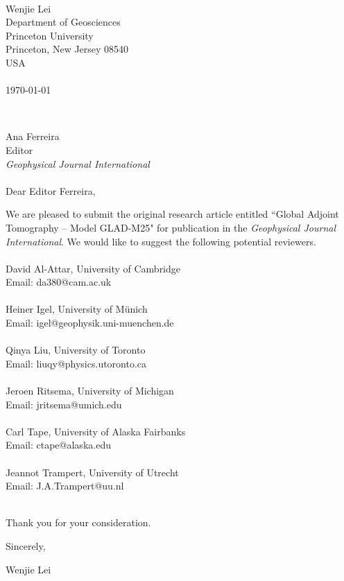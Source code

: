 \documentclass[11pt]{article}
\begin{document}

\begin{minipage}[t]{0.55\textwidth}
~ \vspace{0pt}
\end{minipage}
\begin{minipage}[t]{0.45\textwidth}
Wenjie Lei \\
Department of Geosciences \\
Princeton University \\
Princeton, New Jersey 08540\\
USA \\
~ \\
\today \\ 
\end{minipage} \hspace{0cm}\\

\par
\noindent
Ana Ferreira\\
Editor \\
\textit{Geophysical Journal International}\\
~ \\
Dear Editor Ferreira,\\
\par \noindent
We are pleased to submit the original research article entitled ``Global Adjoint Tomography -- Model GLAD-M25" for publication in the \textit{Geophysical Journal International}. 
We would like to suggest the following potential 
reviewers. \\
~ \\
David Al-Attar, University of Cambridge \\
Email: da380@cam.ac.uk\\
~ \\
Heiner Igel, University of M\"unich \\
Email: igel@geophysik.uni-muenchen.de \\
~ \\
Qinya Liu, University of Toronto\\
Email:  liuqy@physics.utoronto.ca \\
~ \\
Jeroen Ritsema, University of Michigan \\
Email:  jritsema@umich.edu \\
~ \\
Carl Tape, University of Alaska Fairbanks \\
Email:  ctape@alaska.edu \\
~ \\
Jeannot Trampert, University of Utrecht \\
Email: J.A.Trampert@uu.nl \\
~ \\

\par  \noindent
Thank you for your consideration.\\
\par \noindent
Sincerely, \\
\par \noindent
Wenjie Lei
\end{document}
